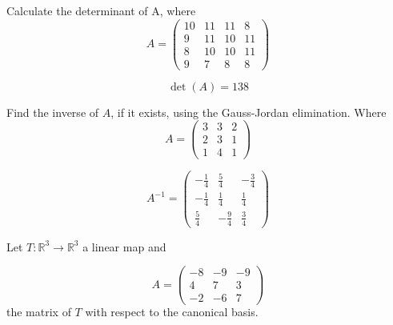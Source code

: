 \begin{questions}

\question Calculate the determinant of A, where
$$
A=\left(\begin{array}{rrrr}
10 & 11 & 11 & 8 \\
9 & 11 & 10 & 11 \\
8 & 10 & 10 & 11 \\
9 & 7 & 8 & 8
\end{array}\right)
$$

\begin{solution}
$$\det(A)=138$$
\end{solution}

\question Find the inverse of $A$, if it exists, using the Gauss-Jordan elimination. Where
$$
A=\left(\begin{array}{rrr}
3 & 3 & 2 \\
2 & 3 & 1 \\
1 & 4 & 1
\end{array}\right)
$$

\begin{solution}
$$A^{-1}=\left(\begin{array}{rrr}
-\frac{1}{4} & \frac{5}{4} & -\frac{3}{4} \\
-\frac{1}{4} & \frac{1}{4} & \frac{1}{4} \\
\frac{5}{4} & -\frac{9}{4} & \frac{3}{4}
\end{array}\right)$$
\end{solution}

\question Let $T:\mathbb{R}^3\rightarrow\mathbb{R}^3$  a linear map and
 
$$
A=\left(\begin{array}{rrr}
-8 & -9 & -9 \\
4 & 7 & 3 \\
-2 & -6 & 7
\end{array}\right)
$$
the matrix of $T$ with respect to the canonical basis.
\end{questions}
